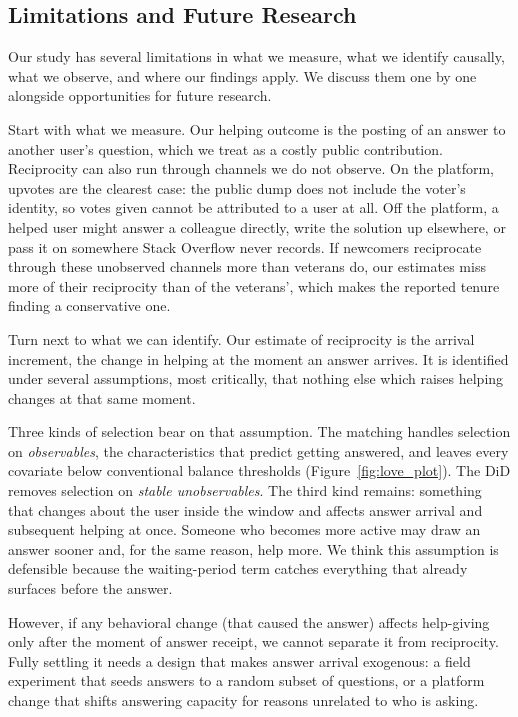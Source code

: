 \subsection{Limitations and Future Research}
\label{sec:limitations}

Our study has several limitations in what we measure, what we identify causally, what we observe, and where our findings apply. We discuss them one by one alongside opportunities for future research.

Start with what we measure. Our helping outcome is the posting of an answer to another user's question, which we treat as a costly public contribution. Reciprocity can also run through channels we do not observe. On the platform, upvotes are the clearest case: the public dump does not include the voter's identity, so votes given cannot be attributed to a user at all. Off the platform, a helped user might answer a colleague directly, write the solution up elsewhere, or pass it on somewhere Stack Overflow never records. If newcomers reciprocate through these unobserved channels more than veterans do, our estimates miss more of their reciprocity than of the veterans', which makes the reported tenure finding a conservative one.

Turn next to what we can identify. Our estimate of reciprocity is the arrival increment, the change in helping at the moment an answer arrives. It is identified under several assumptions, most critically, that nothing else which raises helping changes at that same moment.

Three kinds of selection bear on that assumption. The matching handles selection on \emph{observables}, the characteristics that predict getting answered, and leaves every covariate below conventional balance thresholds (Figure~\ref{fig:love_plot}). The DiD removes selection on \emph{stable unobservables}. The third kind remains: something that changes about the user inside the window and affects answer arrival and subsequent helping at once. Someone who becomes more active may draw an answer sooner and, for the same reason, help more. We think this assumption is defensible because the waiting-period term catches everything that already surfaces before the answer.

However, if any behavioral change (that caused the answer) affects help-giving only after the moment of answer receipt, we cannot separate it from reciprocity. Fully settling it needs a design that makes answer arrival exogenous: a field experiment that seeds answers to a random subset of questions, or a platform change that shifts answering capacity for reasons unrelated to who is asking.

